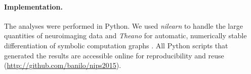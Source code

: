\documentclass{article} %
\DeclareMathOperator*{\argmin}{arg\,min}
\begin{document}





\paragraph{Implementation.}
The analyses were performed in Python.
We used \textit{nilearn} to handle
the large quantities of neuroimaging data 
\cite{abrah14}
and
\textit{Theano} for automatic, numerically stable
differentiation of symbolic computation graphs
\cite{bastien2012theano, bergstra2010theano}.
All Python scripts that generated the results are
accessible online for reproducibility and reuse
(\url{http://github.com/banilo/nips2015}).
  
\end{document}
